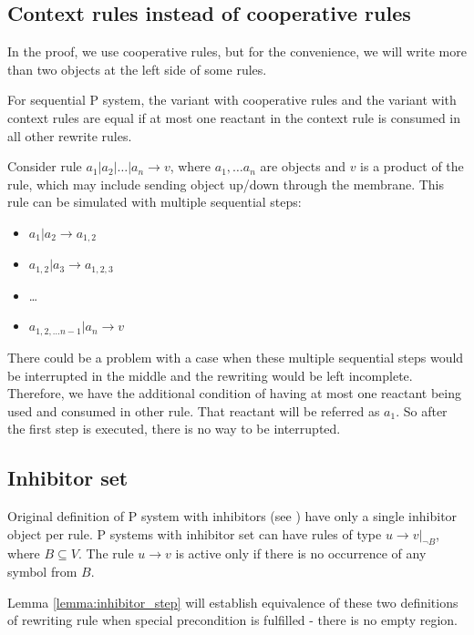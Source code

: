 \subsection{Context rules instead of cooperative rules}
  In the proof, we use cooperative rules, but for the convenience, we will write more than two objects at the left side of some rules.
  \begin{lema}
  \label{lemma:context_rules}
    For sequential P system, the variant with cooperative rules and the variant with context rules are equal if at most one reactant in the context rule is consumed in all other rewrite rules.
  \end{lema}
  \begin{dokaz}
    Consider rule $a_1|a_2|\dots|a_n \rightarrow v$, where $a_1,\dots a_n$ are objects and $v$ is a product of the rule, which may include sending object up/down through the membrane.
    This rule can be simulated with multiple sequential steps:
    \begin{itemize}
      \item $a_1|a_2 \rightarrow a_{1,2}$
      \item $a_{1,2}|a_3 \rightarrow a_{1,2,3}$
      \item \dots
      \item $a_{1,2,\dots n-1}|a_n \rightarrow v$
    \end{itemize}    
  \end{dokaz}
  There could be a problem with a case when these multiple sequential steps would be interrupted in the middle and the rewriting would be left incomplete. Therefore, we have the additional condition of having at most one reactant being used and consumed in other rule. That reactant will be referred as $a_1$. So after the first step is executed, there is no way to be interrupted.

\subsection{Inhibitor set}
Original definition of P system with inhibitors (see \cite{Ionescu:jucs_10_5:on_p_systems_with}) have only a single inhibitor object per rule. P systems with inhibitor set can have rules of type $u\rightarrow v|_{\neg B}$, where $B\subseteq V$. The rule $u\rightarrow v$ is active only if there is no occurrence of any symbol from $B$.

Lemma \ref{lemma:inhibitor_step} will establish equivalence of these two definitions of rewriting rule when special precondition is fulfilled - there is no empty region.

